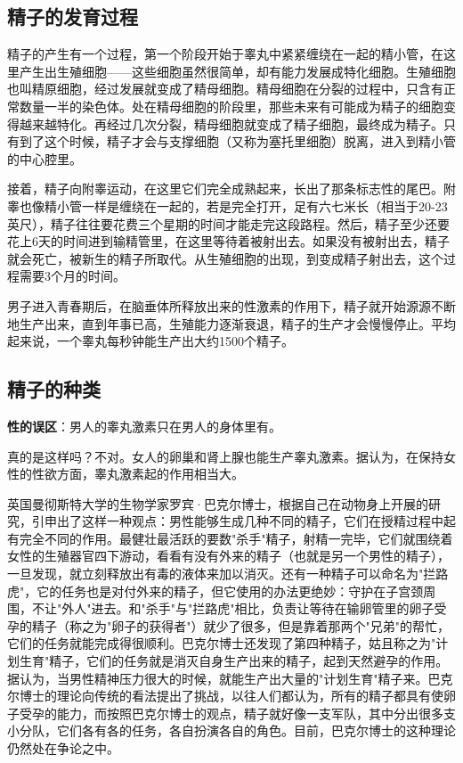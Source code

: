 \subsection{精子的发育过程}

精子的产生有一个过程，第一个阶段开始于睾丸中紧紧缠绕在一起的精小管，在这里产生出生殖细胞——这些细胞虽然很简单，却有能力发展成特化细胞。生殖细胞也叫精原细胞，经过发展就变成了精母细胞。精母细胞在分裂的过程中，只含有正常数量一半的染色体。处在精母细胞的阶段里，那些未来有可能成为精子的细胞变得越来越特化。再经过几次分裂，精母细胞就变成了精子细胞，最终成为精子。只有到了这个时候，精子才会与支撑细胞（又称为塞托里细胞）脱离，进入到精小管的中心腔里。

接着，精子向附睾运动，在这里它们完全成熟起来，长出了那条标志性的尾巴。附睾也像精小管一样是缠绕在一起的，若是完全打开，足有六七米长（相当于20-23英尺），精子往往要花费三个星期的时间才能走完这段路程。然后，精子至少还要花上6天的时间进到输精管里，在这里等待着被射出去。如果没有被射出去，精子就会死亡，被新生的精子所取代。从生殖细胞的出现，到变成精子射出去，这个过程需要3个月的时间。

男子进入青春期后，在脑垂体所释放出来的性激素的作用下，精子就开始源源不断地生产出来，直到年事已高，生殖能力逐渐衰退，精子的生产才会慢慢停止。平均起来说，一个睾丸每秒钟能生产出大约1500个精子。

\subsection{精子的种类}

\textbf{性的误区}：男人的睾丸激素只在男人的身体里有。

真的是这样吗？不对。女人的卵巢和肾上腺也能生产睾丸激素。据认为，在保持女性的性欲方面，睾丸激素起的作用相当大。

英国曼彻斯特大学的生物学家罗宾·巴克尔博士，根据自己在动物身上开展的研究，引申出了这样一种观点：男性能够生成几种不同的精子，它们在授精过程中起有完全不同的作用。最健壮最活跃的要数"杀手"精子，射精一完毕，它们就围绕着女性的生殖器官四下游动，看看有没有外来的精子（也就是另一个男性的精子），一旦发现，就立刻释放出有毒的液体来加以消灭。还有一种精子可以命名为"拦路虎"，它的任务也是对付外来的精子，但它使用的办法更绝妙：守护在子宫颈周围，不让"外人"进去。和"杀手"与"拦路虎"相比，负责让等待在输卵管里的卵子受孕的精子（称之为"卵子的获得者"）就少了很多，但是靠着那两个"兄弟"的帮忙，它们的任务就能完成得很顺利。巴克尔博士还发现了第四种精子，姑且称之为"计划生育"精子，它们的任务就是消灭自身生产出来的精子，起到天然避孕的作用。据认为，当男性精神压力很大的时候，就能生产出大量的"计划生育"精子来。巴克尔博士的理论向传统的看法提出了挑战，以往人们都认为，所有的精子都具有使卵子受孕的能力，而按照巴克尔博士的观点，精子就好像一支军队，其中分出很多支小分队，它们各有各的任务，各自扮演各自的角色。目前，巴克尔博士的这种理论仍然处在争论之中。

